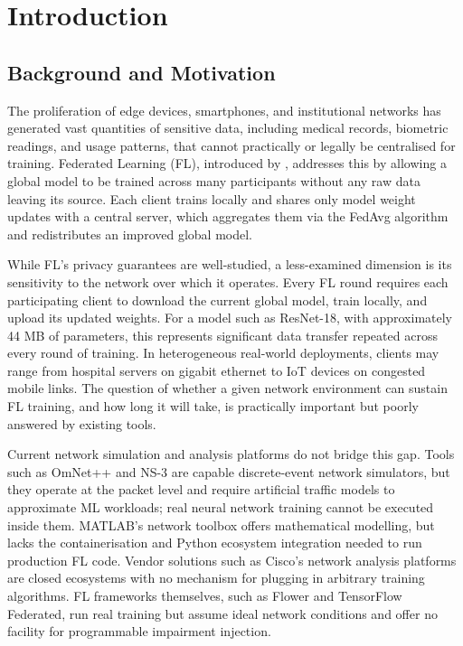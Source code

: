 \documentclass[12pt,a4paper]{report}
\begin{document}
\tableofcontents
\listoffigures
\listoftables

\chapter{Introduction}

\section{Background and Motivation}

The proliferation of edge devices, smartphones, and institutional networks has generated
vast quantities of sensitive data, including medical records, biometric readings, and
usage patterns, that cannot practically or legally be centralised for training.
Federated Learning (FL), introduced by \citet{mcmahan2017communication},
addresses this by allowing a global model to be trained across many participants without
any raw data leaving its source. Each client trains locally and shares only model weight
updates with a central server, which aggregates them via the FedAvg algorithm and
redistributes an improved global model.

While FL's privacy guarantees are well-studied, a less-examined dimension is its
sensitivity to the network over which it operates. Every FL round requires each
participating client to download the current global model, train locally, and upload its
updated weights. For a model such as ResNet-18, with approximately 44 MB of parameters,
this represents significant data transfer repeated across every round of training.
In heterogeneous real-world deployments, clients may range from hospital servers on
gigabit ethernet to IoT devices on congested mobile links. The question of whether a
given network environment can sustain FL training, and how long it will take, is
practically important but poorly answered by existing tools.

Current network simulation and analysis platforms do not bridge this gap. Tools such as
OmNet++ and NS-3 are capable discrete-event network simulators, but they operate at the
packet level and require artificial traffic models to approximate ML workloads; real
neural network training cannot be executed inside them. MATLAB's network toolbox offers
mathematical modelling, but lacks the containerisation and Python ecosystem integration
needed to run production FL code. Vendor solutions such as Cisco's network analysis
platforms are closed ecosystems with no mechanism for plugging in arbitrary training
algorithms. FL frameworks themselves, such as Flower and TensorFlow Federated, run real
training but assume ideal network conditions and offer no facility for programmable
impairment injection.
\end{document}

